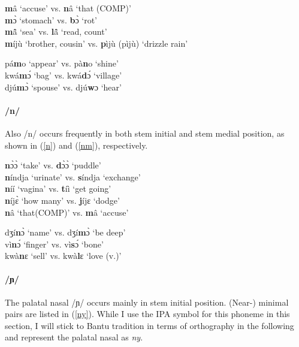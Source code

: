 \begin{exe} \ex \label{m}
{\bfseries m}â `accuse' vs. {\bfseries n}â `that (COMP)' \\
{\bfseries m}ɔ̀ `stomach' vs. {\bfseries b}ɔ̀ `rot' \\
 {\bfseries m}ã̂ `sea' vs. {\bfseries l}ã̂ `read, count' \\
{\bfseries m}íjù `brother, cousin' vs. {\bfseries p}ìjù (pìjù) `drizzle rain'
\end{exe}

\begin{exe} \ex \label{mm}
pá{\bfseries m}o `appear' vs. pà{\bfseries n}o `shine' \\
kwá{\bfseries m}ɔ́ `bag' vs. kwá{\bfseries d}ɔ́ `village' \\
djú{\bfseries m}ɔ̀ `spouse' vs. djú{\bfseries w}ɔ `hear' 
\end{exe}


\paragraph{\bfseries /n/} Also /n/ occurs frequently in both stem initial and stem medial position, as shown in (\ref{n}) and (\ref{nm}), respectively.

\begin{exe} \ex \label{n}
{\bfseries n}ɔ̀ɔ̀ `take' vs. {\bfseries d}ɔ̀ɔ̀ `puddle' \\
{\bfseries n}índja `urinate' vs. {\bfseries s}índja `exchange' \\
{\bfseries n}íí `vagina' vs. {\bfseries t}íì `get going' \\
{\bfseries n}íjɛ̀ `how many' vs. {\bfseries j}íjɛ `dodge' \\
{\bfseries n}â `that(COMP)' vs. {\bfseries m}â `accuse'
\end{exe}

\begin{exe} \ex \label{nm}
dʒí{\bfseries n}ɔ̀ `name' vs. dʒí{\bfseries m}ɔ̀ `be deep' \\
vì{\bfseries n}ɔ́ `finger' vs. vì{\bfseries s}ɔ́ `bone' \\
kwà{\bfseries n}ɛ `sell' vs. kwà{\bfseries l}ɛ `love (v.)'
\end{exe}

\paragraph{\bfseries /ɲ/} The palatal nasal /ɲ/ occurs mainly in stem initial position. (Near-) minimal pairs are listed in (\ref{ny}). While I use the IPA symbol for this phoneme in this section, I will stick to Bantu tradition in terms of orthography in the following and represent the palatal nasal as {\itshape ny}.

